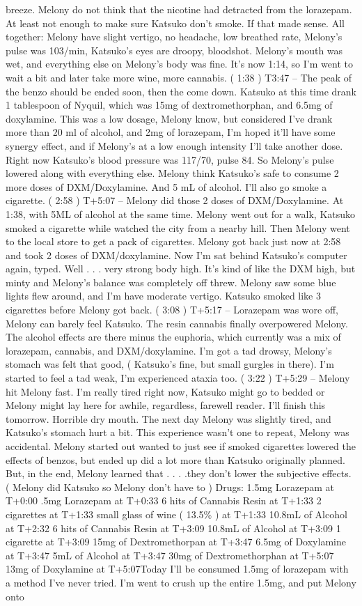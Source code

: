 \documentclass[12pt]{book}
\begin{document}
breeze. Melony do not think that the nicotine had detracted from the lorazepam. At least not enough to make sure Katsuko don't smoke. If that made sense. All together: Melony have slight vertigo, no headache, low breathed rate, Melony's pulse was 103/min, Katsuko's eyes are droopy, bloodshot. Melony's mouth was wet, and everything else on Melony's body was fine. It's now 1:14, so I'm went to wait a bit and later take more wine, more cannabis. ( 1:38 ) T3:47 -- The peak of the benzo should be ended soon, then the come down. Katsuko at this time drank 1 tablespoon of Nyquil, which was 15mg of dextromethorphan, and 6.5mg of doxylamine. This was a low dosage, Melony know, but considered I've drank more than 20 ml of alcohol, and 2mg of lorazepam, I'm hoped it'll have some synergy effect, and if Melony's at a low enough intensity I'll take another dose. Right now Katsuko's blood pressure was 117/70, pulse 84. So Melony's pulse lowered along with everything else. Melony think Katsuko's safe to consume 2 more doses of DXM/Doxylamine. And 5 mL of alcohol. I'll also go smoke a cigarette. ( 2:58 ) T+5:07 -- Melony did those 2 doses of DXM/Doxylamine. At 1:38, with 5ML of alcohol at the same time. Melony went out for a walk, Katsuko smoked a cigarette while watched the city from a nearby hill. Then Melony went to the local store to get a pack of cigarettes. Melony got back just now at 2:58 and took 2 doses of DXM/doxylamine. Now I'm sat behind Katsuko's computer again, typed. Well . . .  very strong body high. It's kind of like the DXM high, but minty and Melony's balance was completely off threw. Melony saw some blue lights flew around, and I'm have moderate vertigo. Katsuko smoked like 3 cigarettes before Melony got back. ( 3:08 ) T+5:17 -- Lorazepam was wore off, Melony can barely feel Katsuko. The resin cannabis finally overpowered Melony. The alcohol effects are there minus the euphoria, which currently was a mix of lorazepam, cannabis, and DXM/doxylamine. I'm got a tad drowsy, Melony's stomach was felt that good, ( Katsuko's fine, but small gurgles in there). I'm started to feel a tad weak, I'm experienced ataxia too. ( 3:22 ) T+5:29 -- Melony hit Melony fast. I'm really tired right now, Katsuko might go to bedded or Melony might lay here for awhile, regardless, farewell reader. I'll finish this tomorrow. Horrible dry mouth. The next day Melony was slightly tired, and Katsuko's stomach hurt a bit. This experience wasn't one to repeat, Melony was accidental. Melony started out wanted to just see if smoked cigarettes lowered the effects of benzos, but ended up did a lot more than Katsuko originally planned. But, in the end, Melony learned that . . .  .they don't lower the subjective effects. ( Melony did Katsuko so Melony don't have to ) Drugs: 1.5mg Lorazepam at T+0:00 .5mg Lorazepam at T+0:33 6 hits of Cannabis Resin at T+1:33 2 cigarettes at T+1:33 small glass of wine ( 13.5\% ) at T+1:33 10.8mL of Alcohol at T+2:32 6 hits of Cannabis Resin at T+3:09 10.8mL of Alcohol at T+3:09 1 cigarette at T+3:09 15mg of Dextromethorpan at T+3:47 6.5mg of Doxylamine at T+3:47 5mL of Alcohol at T+3:47 30mg of Dextromethorphan at T+5:07 13mg of Doxylamine at T+5:07Today I'll be consumed 1.5mg of lorazepam with a method I've never tried. I'm went to crush up the entire 1.5mg, and put Melony onto 
\end{document}
